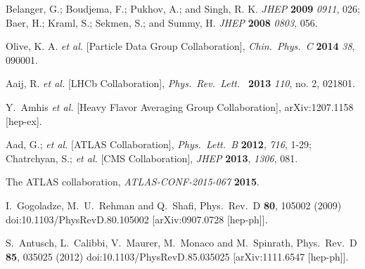 \documentclass[12pt]{article}
\begin{document}
\begin{thebibliography}{99}
  
  
  Belanger, G.; Boudjema, F.; Pukhov, A.; and Singh, R. K.
  {\it JHEP } {\bf 2009} {\it 0911}, 026;
  Baer, H.; Kraml, S.; Sekmen, S.; and Summy, H.
  {\it JHEP } {\bf 2008} {\it 0803}, 056.

  Olive, K. A. {\it et al.} [Particle Data Group Collaboration],
  {\it Chin.\ Phys.\ C } {\bf 2014} {\it 38}, 090001.

  Aaij, R. {\it et al.} [LHCb Collaboration],
  {\it Phys.\ Rev.\ Lett.\ } {\bf 2013}  {\it 110}, no. 2, 021801.

  Y.~Amhis {\it et al.} [Heavy Flavor Averaging Group Collaboration],
  arXiv:1207.1158 [hep-ex].

  Aad, G.; {\it et al.} [ATLAS Collaboration],
  {\it Phys.\ Lett.\ B} {\bf 2012}, {\it 716}, 1-29; 
 Chatrchyan, S.; {\it et al.} [CMS Collaboration],
  {\it JHEP} {\bf 2013}, {\it 1306}, 081.
  
  The ATLAS collaboration,
 {\it  ATLAS-CONF-2015-067} {\bf 2015}.

  I.~Gogoladze, M.~U.~Rehman and Q.~Shafi,
  Phys.\ Rev.\ D {\bf 80}, 105002 (2009)
  doi:10.1103/PhysRevD.80.105002
  [arXiv:0907.0728 [hep-ph]].

  S.~Antusch, L.~Calibbi, V.~Maurer, M.~Monaco and M.~Spinrath,
  Phys.\ Rev.\ D {\bf 85}, 035025 (2012)
  doi:10.1103/PhysRevD.85.035025
  [arXiv:1111.6547 [hep-ph]].



\end{thebibliography}	
\end{document}
